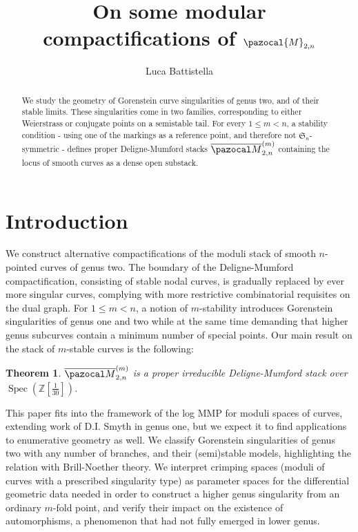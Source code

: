 \documentclass[11pt]{amsart}
\title{On some modular compactifications of $\pazocal{M}_{2,n}$}
\author{Luca Battistella}
\newcommand{\oM}{\overline{\pazocal M}}
\theoremstyle{plain}
\newtheorem*{teo*}{Theorem}
\theoremstyle{definition}
\begin{document}
{
\begin{abstract}
We study the geometry of Gorenstein curve singularities of genus two, and of their stable limits. These singularities come in two families, corresponding to either Weierstrass or conjugate points on a semistable tail. For every $1\leq m <n$, a stability condition - using one of the markings as a reference point, and therefore not $\mathfrak S_n$-symmetric - defines proper Deligne-Mumford stacks $\oM_{2,n}^{(m)}$ containing the locus of smooth curves as a dense open substack.
\end{abstract}}

\maketitle
\tableofcontents

\section{Introduction}
We construct alternative compactifications of the moduli stack of smooth $n$-pointed curves of genus two. The boundary of the Deligne-Mumford compactification, consisting of stable nodal curves, is gradually replaced by ever more singular curves, complying with more restrictive combinatorial requisites on the dual graph. For $1\leq m <n$, a notion of $m$-stability introduces Gorenstein singularities of genus one and two while at the same time demanding that higher genus subcurves contain a minimum number of special points. Our main result on the stack of $m$-stable curves is the following:
\begin{teo*}
 $\oM^{(m)}_{2,n}$ is a \emph{proper} irreducible Deligne-Mumford stack over $\operatorname{Spec}(\mathbb Z[\frac{1}{30}])$.
\end{teo*}
This paper fits into the framework of the log MMP for moduli spaces of curves, extending work of D.I. Smyth in genus one, but we expect it to find applications to enumerative geometry as well. We classify Gorenstein singularities of genus two with any number of branches, and their (semi)stable models, highlighting the relation with Brill-Noether theory. We interpret crimping spaces (moduli of curves with a prescribed singularity type) as parameter spaces for the differential geometric data needed in order to construct a higher genus singularity from an ordinary $m$-fold point, and verify their impact on the existence of automorphisms, a phenomenon that had not fully emerged in lower genus.
\end{document}
